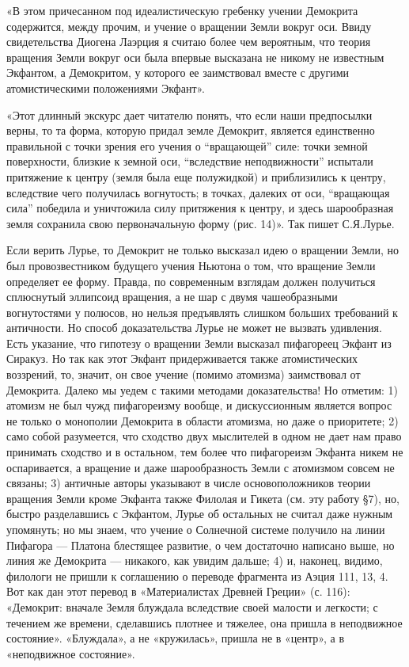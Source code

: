 «В этом причесанном под идеалистическую гребенку учении Демокрита
содержится, между прочим, и учение о вращении Земли вокруг оси. Ввиду
свидетельства Диогена Лаэрция я считаю более чем вероятным, что теория
вращения Земли вокруг оси была впервые высказана не никому не
известным Экфантом, а Демокритом, у которого ее заимствовал вместе с
другими атомистическими положениями Экфант».

«Этот длинный экскурс дает читателю понять, что если наши предпосылки
верны, то та форма, которую придал земле Демокрит, является
единственно правильной с точки зрения его учения о ``вращающей'' силе:
точки земной поверхности, близкие к земной оси, ``вследствие
неподвижности'' испытали притяжение к центру (земля была еще
полужидкой) и приблизились к центру, вследствие чего получилась
вогнутость; в точках, далеких от оси, ``вращающая сила'' победила и
уничтожила силу притяжения к центру, и здесь шарообразная земля
сохранила свою первоначальную форму (рис. 14)». Так пишет С.Я.Лурье.

Если верить Лурье, то Демокрит не только высказал идею о вращении
Земли, но был провозвестником будущего учения Ньютона о том, что
вращение Земли определяет ее форму. Правда, по современным взглядам
должен получиться сплюснутый эллипсоид вращения, а не шар с двумя
чашеобразными вогнутостями у полюсов, но нельзя предъявлять слишком
больших требований к античности. Но способ доказательства Лурье не
может не вызвать удивления. Есть указание, что гипотезу о вращении
Земли высказал пифагореец Экфант из Сиракуз. Но так как этот Экфант
придерживается также атомистических воззрений, то, значит, он свое
учение (помимо атомизма) заимствовал от Демокрита. Далеко мы уедем с
такими методами доказательства! Но отметим: 1) атомизм не был чужд
пифагореизму вообще, и дискуссионным является вопрос не только о
монополии Демокрита в области атомизма, но даже о приоритете; 2) само
собой разумеется, что сходство двух мыслителей в одном не дает нам
право принимать сходство и в остальном, тем более что пифагореизм
Экфанта никем не оспаривается, а вращение и даже шарообразность Земли
с атомизмом совсем не связаны; 3) античные авторы указывают в числе
основоположников теории вращения Земли кроме Экфанта также Филолая и
Гикета (см. эту работу §7), но, быстро разделавшись с Экфантом, Лурье
об остальных не считал даже нужным упомянуть; но мы знаем, что учение
о Солнечной системе получило на линии Пифагора --- Платона блестящее
развитие, о чем достаточно написано выше, но линия же Демокрита ---
никакого, как увидим дальше; 4) и, наконец, видимо, филологи не пришли
к соглашению о переводе фрагмента из Аэция 111, 13, 4. Вот как дан
этот перевод в «Материалистах Древней Греции» (с. 116): «Демокрит:
вначале Земля блуждала вследствие своей малости и легкости; с течением
же времени, сделавшись плотнее и тяжелее, она пришла в неподвижное
состояние». «Блуждала», а не «кружилась», пришла не в «центр», а в
«неподвижное состояние».

